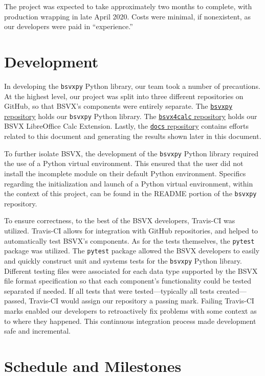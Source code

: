 \documentclass[10pt]{article}
\begin{document}
\indent{}
The project was expected to take approximately two months to complete, with production wrapping in late April 2020.
Costs were minimal, if nonexistent, as our developers were paid in “experience.”

\section*{Development}

In developing the \texttt{bsvxpy} Python library, our team took a number of precautions.
At the highest level, our project was split into three different repositories on GitHub, so that BSVX's components were entirely separate.
The \href{https://github.com/bsvx/bsvxpy}{\texttt{bsvxpy} repository} holds our \texttt{bsvxpy} Python library.
The \href{https://github.com/bsvx/bsvx4calc}{\texttt{bsvx4calc} repository} holds our BSVX LibreOffice Calc Extension.
Lastly, the \href{https://github.com/bsvx/docs}{\texttt{docs} repository} contains efforts related to this document and generating the results shown later in this document.

\indent{}
To further isolate BSVX, the development of the \texttt{bsvxpy} Python library required the use of a Python virtual environment.
This ensured that the user did not install the incomplete module on their default Python environment.
Specifics regarding the initialization and launch of a Python virtual environment, within the context of this project, can be found in the README portion of the \texttt{bsvxpy} repository.

\indent{}
To ensure correctness, to the best of the BSVX developers, Travis-CI was utilized.
Travis-CI allows for integration with GitHub repositories, and helped to automatically test BSVX's components.
As for the tests themselves, the \texttt{pytest} package was utilized.
The \texttt{pytest} package allowed the BSVX developers to easily and quickly construct unit and systems tests for the \texttt{bsvxpy} Python library.
Different testing files were associated for each data type supported by the BSVX file format specification so that each component's functionality could be tested separated if needed.
If all tests that were tested---typically all tests created---passed, Travis-CI would assign our repository a passing mark.
Failing Travis-CI marks enabled our developers to retroactively fix problems with some context as to where they happened.
This continuous integration process made development safe and incremental.

\section*{Schedule and Milestones}
\end{document}
